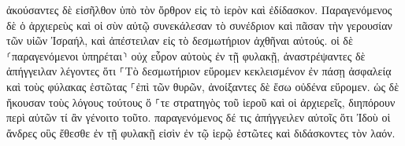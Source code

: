 \documentclass{openreader}
\begin{document}
ἀκούσαντες δὲ εἰσῆλθον ὑπὸ τὸν ὄρθρον εἰς τὸ ἱερὸν καὶ ἐδίδασκον. Παραγενόμενος δὲ ὁ ἀρχιερεὺς καὶ οἱ σὺν αὐτῷ συνεκάλεσαν τὸ συνέδριον καὶ πᾶσαν τὴν γερουσίαν τῶν υἱῶν Ἰσραήλ, καὶ ἀπέστειλαν εἰς τὸ δεσμωτήριον ἀχθῆναι αὐτούς. 
οἱ δὲ ⸂παραγενόμενοι ὑπηρέται⸃ οὐχ εὗρον αὐτοὺς ἐν τῇ φυλακῇ, ἀναστρέψαντες δὲ ἀπήγγειλαν 
λέγοντες ὅτι ⸀Τὸ δεσμωτήριον εὕρομεν κεκλεισμένον ἐν πάσῃ ἀσφαλείᾳ καὶ τοὺς φύλακας ἑστῶτας ⸀ἐπὶ τῶν θυρῶν, ἀνοίξαντες δὲ ἔσω οὐδένα εὕρομεν. 
ὡς δὲ ἤκουσαν τοὺς λόγους τούτους ὅ ⸀τε στρατηγὸς τοῦ ἱεροῦ καὶ οἱ ἀρχιερεῖς, διηπόρουν περὶ αὐτῶν τί ἂν γένοιτο τοῦτο. 
παραγενόμενος δέ τις ἀπήγγειλεν αὐτοῖς ὅτι Ἰδοὺ οἱ ἄνδρες οὓς ἔθεσθε ἐν τῇ φυλακῇ εἰσὶν ἐν τῷ ἱερῷ ἑστῶτες καὶ διδάσκοντες τὸν λαόν. 
\end{document}
